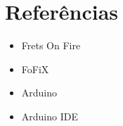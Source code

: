 \section{Referências}\label{referuxeancias}

\begin{itemize}
\itemsep1pt\parskip0pt
\item
  Frets On Fire
\item
  FoFiX
\item
  Arduino
\item
  Arduino IDE
\end{itemize}
